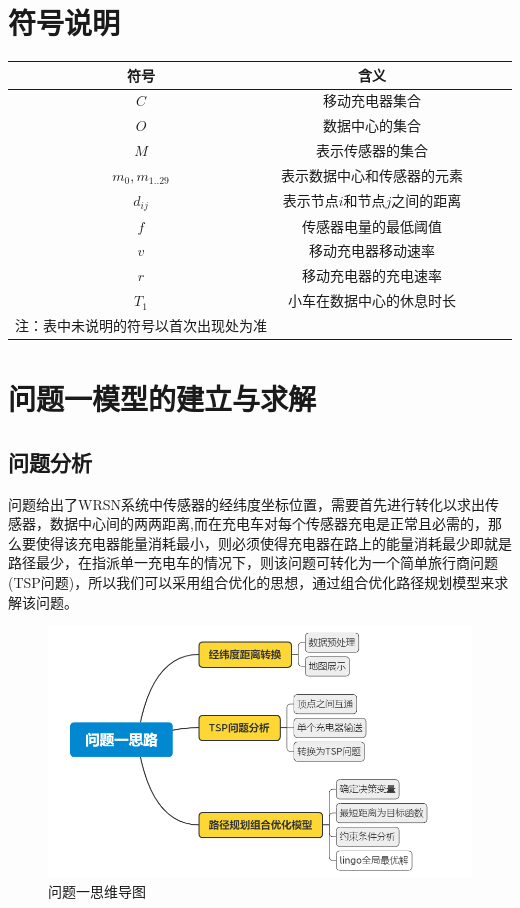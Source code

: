 \documentclass{whutmod}
\newcommand{\upcite}[1]{\textsuperscript{\textsuperscript{\cite{#1}}}}
\begin{document}
\section{符号说明}
\begin{center}
	\begin{tabular}{ccccc}
		\toprule[1.5pt]
		符号 & 含义\\
		\midrule[1pt]
		$C$ & 移动充电器集合\\
		$O$& 数据中心的集合\\
		$M$& 表示传感器的集合\\
		$m_0,m_{1..29}$ &表示数据中心和传感器的元素\\
		$d_{ij}$&表示节点$i$和节点$j$之间的距离\\
		$f$ & 传感器电量的最低阈值\\
		$v$ & 移动充电器移动速率\\
		$r$ & 移动充电器的充电速率\\
		$T_1$&小车在数据中心的休息时长\\
		\bottomrule[1.5pt]
		注：表中未说明的符号以首次出现处为准
	\end{tabular}
\end{center}




\section{问题一模型的建立与求解}
\subsection{问题分析}
问题给出了WRSN系统中传感器的经纬度坐标位置，需要首先进行转化以求出传感器，数据中心间的两两距离,而在充电车对每个传感器充电是正常且必需的，那么要使得该充电器能量消耗最小，则必须使得充电器在路上的能量消耗最少即就是路径最少，在指派单一充电车的情况下，则该问题可转化为一个简单旅行商问题(TSP问题)，所以我们可以采用组合优化的思想，通过组合优化路径规划模型来求解该问题。
\begin{figure}[!htbp]
	\centering
	\includegraphics[width=.6\textwidth]{figures/mindmap1.png}
	\caption{问题一思维导图}
\end{figure} 
\end{document}
